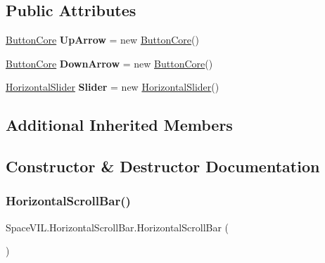 \subsection*{Public Attributes}
\begin{DoxyCompactItemize}
\item 
\mbox{\label{class_space_v_i_l_1_1_horizontal_scroll_bar_ae7ac8ef1bd400e2e96ed3ac6e8d40e5d}} 
\mbox{\hyperlink{class_space_v_i_l_1_1_button_core}{Button\+Core}} {\bfseries Up\+Arrow} = new \mbox{\hyperlink{class_space_v_i_l_1_1_button_core}{Button\+Core}}()
\item 
\mbox{\label{class_space_v_i_l_1_1_horizontal_scroll_bar_ac29950a695f1facac9d6f650557a8949}} 
\mbox{\hyperlink{class_space_v_i_l_1_1_button_core}{Button\+Core}} {\bfseries Down\+Arrow} = new \mbox{\hyperlink{class_space_v_i_l_1_1_button_core}{Button\+Core}}()
\item 
\mbox{\label{class_space_v_i_l_1_1_horizontal_scroll_bar_a77b1c15d1daf829f4df1e99ab48f2bab}} 
\mbox{\hyperlink{class_space_v_i_l_1_1_horizontal_slider}{Horizontal\+Slider}} {\bfseries Slider} = new \mbox{\hyperlink{class_space_v_i_l_1_1_horizontal_slider}{Horizontal\+Slider}}()
\end{DoxyCompactItemize}
\subsection*{Additional Inherited Members}


\subsection{Constructor \& Destructor Documentation}
\mbox{\label{class_space_v_i_l_1_1_horizontal_scroll_bar_ae2deb22bc8679c96c968a955f3796806}} 
\subsubsection{\texorpdfstring{Horizontal\+Scroll\+Bar()}{HorizontalScrollBar()}}
{\footnotesize\ttfamily Space\+V\+I\+L.\+Horizontal\+Scroll\+Bar.\+Horizontal\+Scroll\+Bar (\begin{DoxyParamCaption}{ }\end{DoxyParamCaption})}



